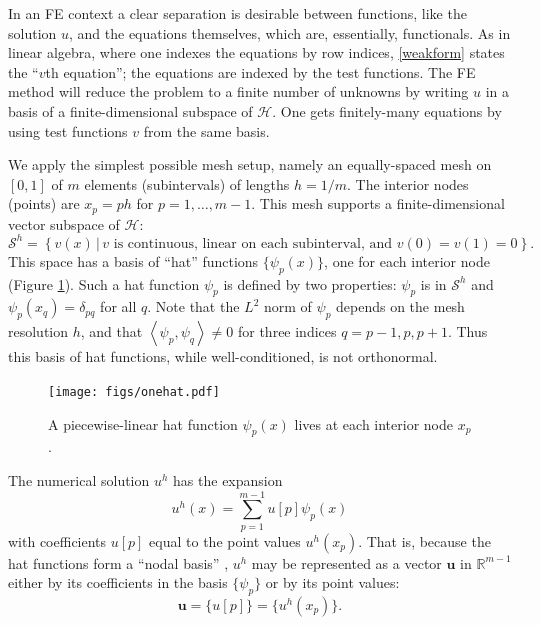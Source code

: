 \documentclass[letterpaper,final,12pt,reqno]{amsart}
\newcommand{\RR}{\mathbb{R}}
\newcommand{\bu}{\mathbf{u}}
\newcommand{\ip}[2]{\left<#1,#2\right>}
\begin{document}
In an FE context a clear separation is desirable between functions, like the solution $u$, and the equations themselves, which are, essentially, functionals.  As in linear algebra, where one indexes the equations by row indices, \eqref{weakform} states the ``$v$th equation''; the equations are indexed by the test functions.  The FE method will reduce the problem to a finite number of unknowns by writing $u$ in a basis of a finite-dimensional subspace of $\mathcal{H}$.  One gets finitely-many equations by using test functions $v$ from the same basis.

We apply the simplest possible mesh setup, namely an equally-spaced mesh on $[0,1]$ of $m$ elements (subintervals) of lengths $h=1/m$.  The interior nodes (points) are $x_p=ph$ for $p=1,\dots,m-1$.  This mesh supports a finite-dimensional vector subspace of $\mathcal{H}$:
\begin{equation}
\mathcal{S}^h = \left\{v(x)\,\big|\,v \text{ is continuous, linear on each subinterval, and } v(0)=v(1)=0\right\}.  \label{fespace}
\end{equation}
This space has a basis of ``hat'' functions $\{\psi_p(x)\}$, one for each interior node (Figure \ref{fig:onehat}).  Such a hat function $\psi_p$ is defined by two properties: $\psi_p$ is in $\mathcal{S}^h$ and $\psi_p(x_q)=\delta_{pq}$ for all $q$.  Note that the $L^2$ norm of $\psi_p$ depends on the mesh resolution $h$, and that $\ip{\psi_p}{\psi_q}\ne 0$ for three indices $q=p-1,p,p+1$.  Thus this basis of hat functions, while well-conditioned, is not orthonormal.

\begin{figure}
\texttt{[image: figs/onehat.pdf]}
\caption{A piecewise-linear hat function $\psi_p(x)$ lives at each interior node $x_p$.}
\label{fig:onehat}
\end{figure}

The numerical solution $u^h$ has the expansion
\begin{equation}
  u^h(x) = \sum_{p=1}^{m-1} u[p] \psi_p(x)  \label{fesolution}
\end{equation}
with coefficients $u[p]$ equal to the point values $u^h(x_p)$.  That is, because the hat functions form a ``nodal basis'' \cite{Elmanetal2014}, $u^h$ may be represented as a vector $\bu$ in $\RR^{m-1}$ either by its coefficients in the basis $\{\psi_p\}$ or by its point values:
\begin{equation}
\bu =\{u[p]\} = \{u^h(x_p)\}.  \label{fevector}
\end{equation}
\end{document}
